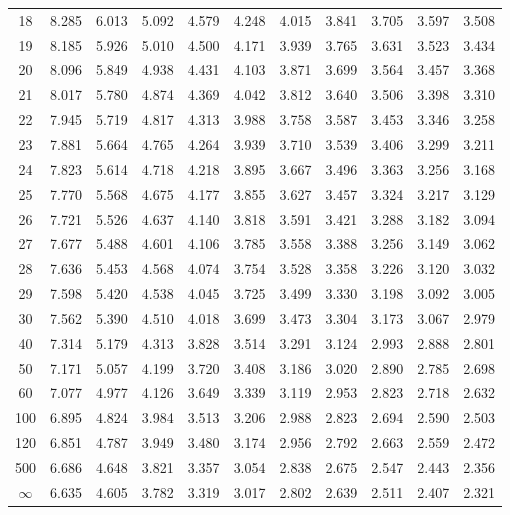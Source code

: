 \documentclass[12pt]{article}
\begin{document}
\begin{table}
\begin{center}
{\begin{tabular}{|c|c|c|c|c|c|c|c|c|c|c|}
	18& 8.285& 6.013& 5.092& 4.579 &4.248& 4.015& 3.841& 3.705& 3.597& 3.508\\
	19& 8.185& 5.926& 5.010 &4.500& 4.171& 3.939& 3.765 &3.631& 3.523& 3.434\\
	20& 8.096& 5.849& 4.938& 4.431& 4.103& 3.871 &3.699& 3.564& 3.457 &3.368\\
	21& 8.017& 5.780& 4.874& 4.369& 4.042& 3.812& 3.640& 3.506 &3.398& 3.310\\
	22 &7.945& 5.719& 4.817& 4.313& 3.988& 3.758 &3.587& 3.453& 3.346& 3.258\\
	23& 7.881& 5.664& 4.765& 4.264& 3.939 &3.710& 3.539 &3.406 &3.299& 3.211\\
	24& 7.823& 5.614& 4.718& 4.218& 3.895& 3.667 &3.496& 3.363 &3.256& 3.168\\
	25&7.770& 5.568& 4.675& 4.177& 3.855& 3.627& 3.457& 3.324& 3.217 &3.129\\
	26 &7.721 &5.526& 4.637& 4.140& 3.818& 3.591 &3.421& 3.288& 3.182& 3.094\\
	27& 7.677& 5.488& 4.601 &4.106& 3.785 &3.558& 3.388& 3.256& 3.149 &3.062\\
	28& 7.636& 5.453& 4.568& 4.074& 3.754& 3.528 &3.358& 3.226& 3.120& 3.032 \\
	29 &7.598 &5.420 &4.538& 4.045& 3.725& 3.499& 3.330& 3.198& 3.092& 3.005 \\
	30& 7.562 &5.390& 4.510& 4.018& 3.699& 3.473& 3.304 &3.173& 3.067 &2.979\\
	40& 7.314& 5.179& 4.313& 3.828& 3.514& 3.291& 3.124& 2.993& 2.888 &2.801\\
	50& 7.171& 5.057& 4.199& 3.720& 3.408& 3.186& 3.020& 2.890& 2.785& 2.698\\
	60& 7.077& 4.977& 4.126& 3.649& 3.339& 3.119 &2.953& 2.823& 2.718& 2.632\\
	100& 6.895& 4.824& 3.984& 3.513& 3.206& 2.988& 2.823& 2.694& 2.590& 2.503\\
	120& 6.851& 4.787& 3.949& 3.480& 3.174& 2.956& 2.792& 2.663& 2.559& 2.472\\
	500& 6.686 &4.648 &3.821& 3.357& 3.054& 2.838& 2.675& 2.547& 2.443& 2.356\\ \hline
	$\infty$ & 6.635& 4.605& 3.782& 3.319& 3.017& 2.802& 2.639& 2.511& 2.407& 2.321\\
	\hline
\end{tabular}
}
\end{center}
\end{table}

\end{document}
